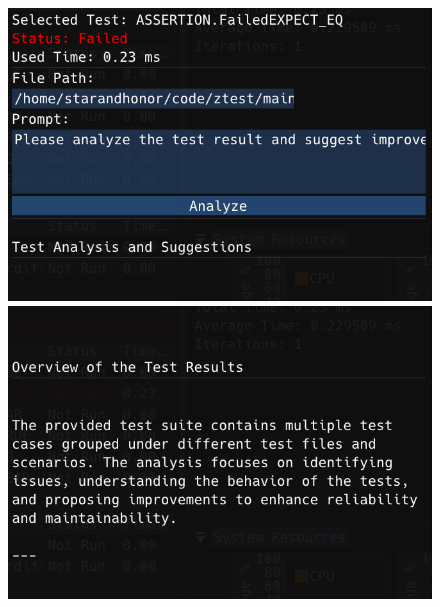 \documentclass{article}
\begin{document}
\begin{figure}[H]
    \centering
    \begin{minipage}{0.45\textwidth}
        \includegraphics[width=\textwidth]{img/aih1.png}
    \end{minipage}
    \hfill
    \begin{minipage}{0.45\textwidth}
        \includegraphics[width=\textwidth]{img/aih2.png}
    \end{minipage}
\end{figure}
\end{document}
